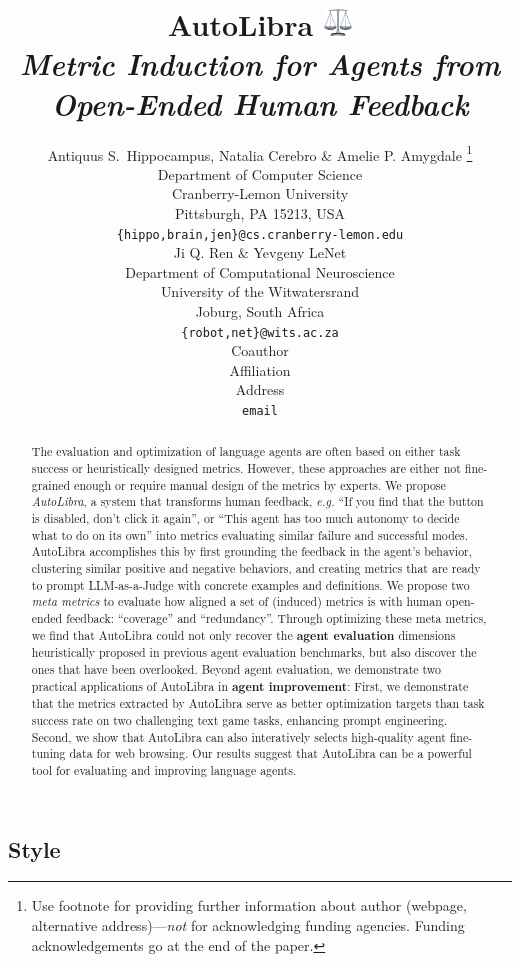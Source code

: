 \documentclass{article} %
\title{AutoLibra \protect\includegraphics[height=1em]{figs/scale.png} \\ \textit{Metric Induction for Agents from Open-Ended Human Feedback}}
\author{Antiquus S.~Hippocampus, Natalia Cerebro \& Amelie P. Amygdale \thanks{ Use footnote for providing further information
about author (webpage, alternative address)---\emph{not} for acknowledging
funding agencies.  Funding acknowledgements go at the end of the paper.} \\
Department of Computer Science\\
Cranberry-Lemon University\\
Pittsburgh, PA 15213, USA \\
\texttt{\{hippo,brain,jen\}@cs.cranberry-lemon.edu} \\
\And
Ji Q. Ren \& Yevgeny LeNet \\
Department of Computational Neuroscience \\
University of the Witwatersrand \\
Joburg, South Africa \\
\texttt{\{robot,net\}@wits.ac.za} \\
\AND
Coauthor \\
Affiliation \\
Address \\
\texttt{email}
}
\begin{document}
\ifcolmsubmission
\linenumbers
\fi

\maketitle

\begin{abstract}
The evaluation and optimization of language agents are often based on either
task success or heuristically designed metrics.
However, these approaches are either not fine-grained enough or require 
manual design of the metrics by experts.
We propose \emph{AutoLibra},
a system that transforms human feedback, 
\emph{e.g.} ``\textsf{If you find that the button is disabled, don't click it again}'',
or ``\textsf{This agent has too much autonomy to decide what to do on its own}''
into metrics evaluating similar failure and successful modes.
AutoLibra accomplishes this by first grounding the feedback in the agent's behavior,
clustering similar positive and negative behaviors,
and creating metrics that are ready to prompt LLM-as-a-Judge with
concrete examples and definitions. 
We propose two \emph{meta metrics} to evaluate how aligned a set of (induced) metrics
is with human open-ended feedback: ``coverage'' and ``redundancy''.
Through optimizing these meta metrics, we find that AutoLibra could
not only recover the \textbf{agent evaluation} dimensions heuristically proposed
in previous agent evaluation benchmarks, but also discover the ones that have been overlooked.
Beyond agent evaluation, we demonstrate two practical applications of
AutoLibra in \textbf{agent improvement}:
First, we demonstrate that the metrics extracted by AutoLibra serve
as better optimization targets than task success rate on two challenging text game tasks,
enhancing prompt engineering. 
Second, we show that AutoLibra can also interatively selects high-quality agent fine-tuning data
for web browsing. 
Our results suggest that AutoLibra can be a powerful tool for
evaluating and improving language agents.
\end{abstract}












\subsection{Style}
\end{document}
